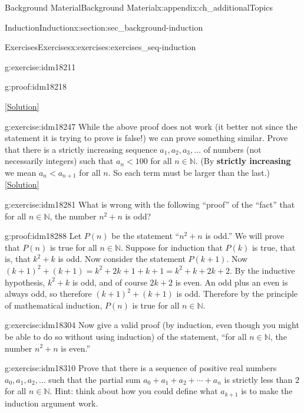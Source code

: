 \documentclass[oneside,10pt,]{book}
\newcommand{\terminology}[1]{\textbf{#1}}
\numberwithin{equation}{chapter}
\def\N{\mathbb N}
\newcommand{\lt}{<}
\begin{document}
\begin{appendixptx}{Background Material}{}{Background Material}{}{}{x:appendix:ch_additionalTopics}
\begin{sectionptx}{Induction}{}{Induction}{}{}{x:section:sec_background-induction}
\begin{exercises-subsection}{Exercises}{}{Exercises}{}{}{x:exercises:exercises_seq-induction}
\begin{divisionexercise}{12}{}{}{g:exercise:idm18211}
\begin{proofptx}{}{g:proof:idm18218}
\end{proofptx}
\space\hspace*{0pt}\hfill{\tiny\hyperlink{g:solution:idm18237-main}{[Solution]}}\end{divisionexercise}%
\begin{divisionexercise}{13}{}{}{g:exercise:idm18247}%
While the above proof does not work (it better not since the statement it is trying to prove is false!) we can prove something similar. Prove that there is a strictly increasing sequence \(a_1, a_2, a_3, \ldots\) of numbers (not necessarily integers) such that \(a_n \lt  100\) for all \(n \in \N\). (By \terminology{strictly increasing} we mean \(a_n \lt  a_{n+1}\) for all \(n\). So each term must be larger than the last.)%
\space\hspace*{0pt}\hfill{\tiny\hyperlink{g:solution:idm18256-main}{[Solution]}}\end{divisionexercise}%
\begin{divisionexercise}{14}{}{}{g:exercise:idm18281}%
What is wrong with the following ``proof'' of the ``fact'' that for all \(n \in \N\), the number \(n^2 + n\) is odd?%
\begin{proofptx}{}{g:proof:idm18288}
Let \(P(n)\) be the statement ``\(n^2 + n\) is odd.'' We will prove that \(P(n)\) is true for all \(n \in \N\). Suppose for induction that \(P(k)\) is true, that is, that \(k^2 + k\) is odd. Now consider the statement \(P(k+1)\). Now \((k+1)^2 + (k+1) = k^2 + 2k + 1 + k + 1 = k^2 + k + 2k + 2\). By the inductive hypothesis, \(k^2 + k\) is odd, and of course \(2k + 2\) is even. An odd plus an even is always odd, so therefore \((k+1)^2 + (k+1)\) is odd. Therefore by the principle of mathematical induction, \(P(n)\) is true for all \(n \in \N\).%
\end{proofptx}
\end{divisionexercise}%
\begin{divisionexercise}{15}{}{}{g:exercise:idm18304}%
Now give a valid proof (by induction, even though you might be able to do so without using induction) of the statement, ``for all \(n \in \N\), the number \(n^2 + n\) is even.''%
\end{divisionexercise}%
\begin{divisionexercise}{16}{}{}{g:exercise:idm18310}%
Prove that there is a sequence of positive real numbers \(a_0, a_1, a_2, \ldots\) such that the partial sum \(a_0 + a_1 + a_2 + \cdots + a_n\) is strictly less than \(2\) for all \(n \in \N\). Hint: think about how you could define what \(a_{k+1}\) is to make the induction argument work.%

\end{divisionexercise}
\end{exercises-subsection}
\end{sectionptx}
\end{appendixptx}
\end{document}
